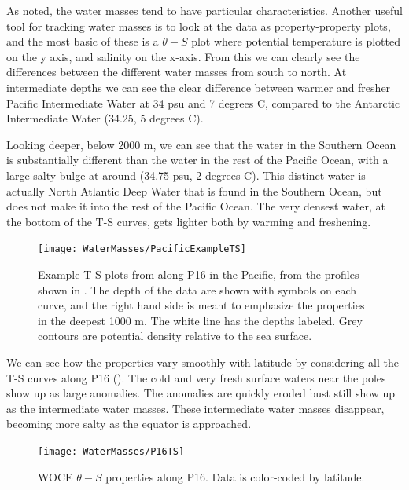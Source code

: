 As noted, the water masses tend to have particular characteristics.  Another useful tool for tracking water masses is to look at the data as property-property plots, and the most basic of these is a $\theta-S$ plot where potential temperature is plotted on the y axis, and salinity on the x-axis.  From this we can clearly see the differences between the different water masses from south to north.  At intermediate depths we can see the clear difference between warmer and fresher Pacific Intermediate Water at 34 psu and 7 degrees C, compared to the Antarctic Intermediate Water (34.25, 5 degrees C). 

Looking deeper, below 2000 m, we can see that the water in the Southern Ocean is substantially different than the water in the rest of the Pacific Ocean, with a large salty bulge at around (34.75 psu, 2 degrees C).  This distinct water is actually North Atlantic Deep Water that is found in the Southern Ocean, but does not make it into the rest of the Pacific Ocean.  The very densest water, at the bottom of the T-S curves, gets lighter both by warming and freshening.  

\begin{figure}[htp]
  \centering
  \texttt{[image: WaterMasses/PacificExampleTS]}
      \caption{Example T-S plots from along P16 in the Pacific, from the profiles shown in .  The depth of the data are shown with symbols on each curve, and the right hand side is meant to emphasize the properties in the deepest 1000 m. The white line has the depths labeled.  Grey contours are potential density relative to the sea surface.}
    \label{fig:PacificExampleTS}  
\end{figure}

We can see how the properties vary smoothly with latitude by considering all the T-S curves along P16 ().  The cold and very fresh surface waters near the poles show up as large anomalies.  The anomalies are quickly eroded bust still show up as the intermediate water masses.  These intermediate water masses disappear, becoming more salty as the equator is approached.  

\begin{figure}[htp]
  \centering
  \texttt{[image: WaterMasses/P16TS]}
      \caption{WOCE $\theta-S$ properties along P16.  Data is color-coded by latitude.}
    \label{fig:P16TS}  
\end{figure}

